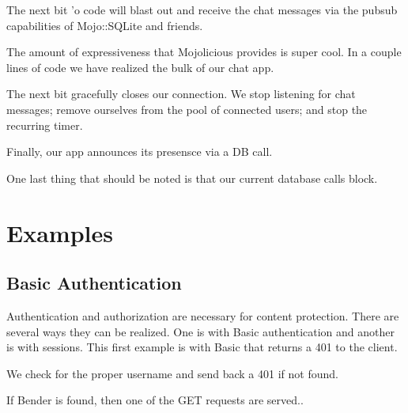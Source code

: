 \documentclass[14pt]{extreport}
\begin{document}


The next bit 'o code will blast out and receive the chat messages via the
pubsub capabilities of Mojo::SQLite and friends.



The amount of expressiveness that Mojolicious provides is super cool.  In a
couple lines of code we have realized the bulk of our chat app.

The next bit gracefully closes our connection.  We stop listening for chat
messages; remove ourselves from the pool of connected users; and stop the
recurring timer.



Finally, our app announces its presensce via a DB call.



One last thing that should be noted is that our current database calls block.

\chapter*{Examples}

\section{Basic Authentication}

Authentication and authorization are necessary for content protection.  There
are several ways they can be realized.  One is with Basic authentication and
another is with sessions.  This first example is with Basic that returns a 401
to the client.

We check for the proper username and send back a 401 if not found.



\clearpage

If Bender is found, then one of the GET requests are served..


\end{document}
